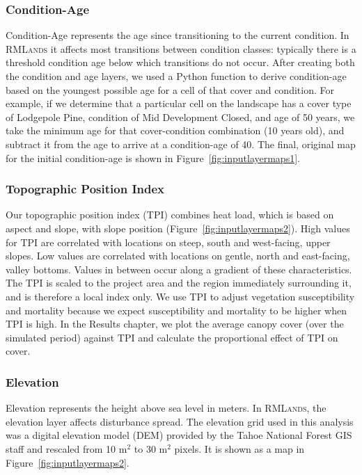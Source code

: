 \subsubsection{Condition-Age}
Condition-Age represents the age since transitioning to the current condition. In \textsc{RMLands} it affects most transitions between condition classes: typically there is a threshold condition age below which transitions do not occur. After creating both the condition and age layers, we used a Python function to derive condition-age based on the youngest possible age for a cell of that cover and condition. For example, if we determine that a particular cell on the landscape has a cover type of Lodgepole Pine, condition of Mid Development Closed, and age of 50 years, we take the minimum age for that cover-condition combination (10 years old), and subtract it from the age to arrive at a condition-age of 40. The final, original map for the initial condition-age is shown in Figure~\ref{fig:inputlayermaps1}.


\subsubsection{Topographic Position Index}
Our topographic position index (TPI) combines heat load, which is based on aspect and slope, with slope position (Figure~\ref{fig:inputlayermaps2}). High values for TPI are correlated with locations on steep, south and west-facing, upper slopes. Low values are correlated with locations on gentle, north and east-facing, valley bottoms. Values in between occur along a gradient of these characteristics. The TPI is scaled to the project area and the region immediately surrounding it, and is therefore a local index only. We use TPI to adjust vegetation susceptibility and mortality because we expect susceptibility and mortality to be higher when TPI is high. In the Results chapter, we plot the average canopy cover (over the simulated period) against TPI and calculate the proportional effect of TPI on cover.



\subsubsection{Elevation} 
Elevation represents the height above sea level in meters. In \textsc{RMLands}, the elevation layer affects disturbance spread. The elevation grid used in this analysis was a digital elevation model (DEM) provided by the Tahoe National Forest GIS staff and rescaled from 10 m$^2$ to 30 m$^2$ pixels. It is shown as a map in Figure~\ref{fig:inputlayermaps2}.



